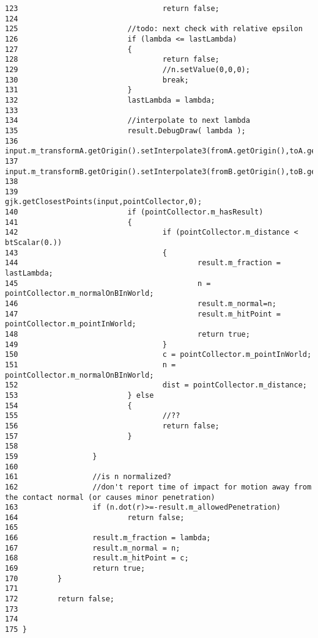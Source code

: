 \begin{Code}
\begin{verbatim}
123                                 return false;
124 
125                         //todo: next check with relative epsilon
126                         if (lambda <= lastLambda)
127                         {
128                                 return false;
129                                 //n.setValue(0,0,0);
130                                 break;
131                         }
132                         lastLambda = lambda;
133 
134                         //interpolate to next lambda
135                         result.DebugDraw( lambda );
136                         input.m_transformA.getOrigin().setInterpolate3(fromA.getOrigin(),toA.getOrigin(),lambda);
137                         input.m_transformB.getOrigin().setInterpolate3(fromB.getOrigin(),toB.getOrigin(),lambda);
138                         
139                         gjk.getClosestPoints(input,pointCollector,0);
140                         if (pointCollector.m_hasResult)
141                         {
142                                 if (pointCollector.m_distance < btScalar(0.))
143                                 {
144                                         result.m_fraction = lastLambda;
145                                         n = pointCollector.m_normalOnBInWorld;
146                                         result.m_normal=n;
147                                         result.m_hitPoint = pointCollector.m_pointInWorld;
148                                         return true;
149                                 }
150                                 c = pointCollector.m_pointInWorld;              
151                                 n = pointCollector.m_normalOnBInWorld;
152                                 dist = pointCollector.m_distance;
153                         } else
154                         {
155                                 //??
156                                 return false;
157                         }
158 
159                 }
160 
161                 //is n normalized?
162                 //don't report time of impact for motion away from the contact normal (or causes minor penetration)
163                 if (n.dot(r)>=-result.m_allowedPenetration)
164                         return false;
165 
166                 result.m_fraction = lambda;
167                 result.m_normal = n;
168                 result.m_hitPoint = c;
169                 return true;
170         }
171 
172         return false;
173 
174 
175 }
\end{verbatim}
\end{Code}




